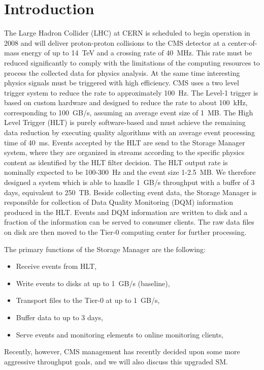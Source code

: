 
\section{\label{sec:intro}Introduction}

The Large Hadron Collider (LHC) at CERN is scheduled to begin operation in 2008 
and will deliver proton-proton collisions to the CMS detector at a center-of-mass energy 
of up to 14~TeV and a crossing rate of 40~MHz. 
This rate must be reduced significantly to comply with the limitations of the computing resources to process the collected data for physics analysis. 
At the same time interesting physics signals must be triggered with high efficiency. 
CMS uses a two level trigger system to reduce the rate to approximately 100~Hz. 
The Level-1 trigger is based on custom hardware and designed to reduce the rate to about 100~kHz, corresponding to 100~GB/s, assuming an average event size of 1~MB. 
The High Level Trigger (HLT) is purely software-based and  must achieve the remaining data reduction by executing quality algorithms with an average event processing time of 40~ms. 
Events accepted by the HLT are send to the Storage Manager system, where they are organized in streams according to the specific physics content as identified by the HLT filter decision. 
The HLT output rate is nominally expected to be 100-300~Hz and the event size 1-2.5~MB. 
We therefore designed a system which is able to handle 1~GB/s throughput with a buffer of 3 days, 
equivalent to 250~TB.
Beside collecting event data, the Storage Manager is responsible for collection of Data Quality Monitoring (DQM) information produced in the HLT. 
Events and DQM information are written to disk and a fraction of the information can be served to consumer clients. 
The raw data files on disk are then moved to the Tier-0 computing center for further processing. 

The primary functions of the Storage Manager are the following:
\begin{itemize}
\item Receive events from HLT,
\item Write events to disks at up to 1~GB/s (baseline),
\item Transport files to the Tier-0 at up to 1~GB/s,
\item Buffer data to up to 3 days,
\item Serve events and monitoring elements to online monitoring clients,
\end{itemize}

Recently, however, CMS management has recently decided upon some more aggressive throughput goals,
and we will also discuss this upgraded SM. 
